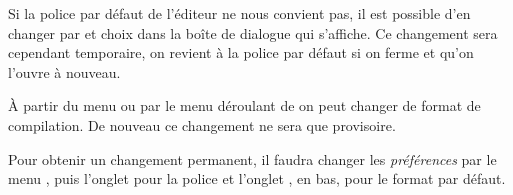 Si la police par défaut de l'éditeur ne nous convient pas, il est possible d'en changer par \submenu{} et choix dans la boîte de dialogue qui s'affiche. Ce changement sera cependant temporaire, on revient à la police par défaut si on ferme \Tw{} et qu'on l'ouvre à nouveau.

À partir du menu  ou par le menu déroulant de  on peut changer de format de compilation. De nouveau ce changement ne sera que provisoire.

Pour obtenir un changement permanent, il faudra changer les \emph{préférences} par le menu \submenu{}, puis l'onglet  pour la police et l'onglet , en bas, pour le format par défaut.

